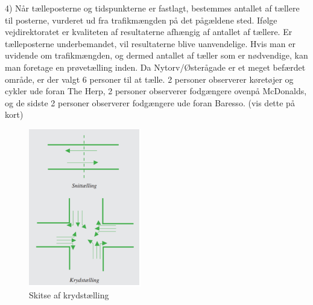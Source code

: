 4) Når tælleposterne og tidspunkterne er fastlagt, bestemmes antallet af tællere til posterne, vurderet ud fra trafikmængden på det pågældene sted. Ifølge vejdirektoratet er kvaliteten af resultaterne afhængig af antallet af tællere. Er tælleposterne underbemandet, vil resultaterne blive uanvendelige. Hvis man er uvidende om trafikmængden, og dermed antallet af tæller som er nødvendige, kan man foretage en prøvetælling inden. Da Nytorv/Østerågade er et meget befærdet område, er der valgt 6 personer til at tælle. 2 personer observerer køretøjer og cykler ude foran The Herp, 2 personer observerer fodgængere ovenpå McDonalds, og de sidste 2 personer observerer fodgængere ude foran Baresso. (vis dette på kort)


 \begin{figure}[htbp]
   \label{fig:krydstaelling}
   \centering
   \begin{adjustbox}{max width=\textwidth}
     \includegraphics[scale=1]{figures/Billederogfigur/krydstaelling.png}
  \end{adjustbox}
   \caption{Skitse af krydstælling}
 \end{figure}


